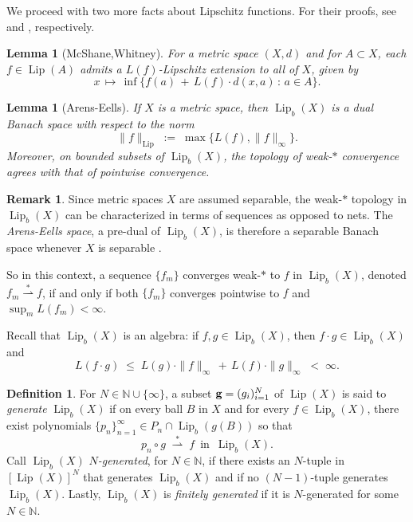 \documentclass[reqno]{amsart}
\theoremstyle{plain}
\newtheorem{lemma}[thm]{Lemma}
\theoremstyle{definition}
\newtheorem{defn}[thm]{Definition}
\newtheorem{rmk}[thm]{Remark}
\theoremstyle{remark}
\numberwithin{equation}{section}
\newcommand{\Lip}{\operatorname{Lip}}
\newcommand{\N}{\mathbb{N}}
\newcommand{\wsto}{\stackrel{*}{\rightharpoonup}}
\begin{document}
We proceed with two more facts about Lipschitz functions.  For their proofs, see \cite{McShane} and \cite{Arens:Eells}, respectively.

\begin{lemma}[McShane,Whitney] \label{lemma_mcshane}
For a metric space $(X,d)$ and for $A \subset X$, each $f \in \Lip(A)$ admits a $L(f)$-Lipschitz extension to all of $X$, given by
$$
x \,\mapsto\, \inf \big\{ f(a) \,+\, L(f) \cdot d(x,a) \,:\, a \in A \big\}.
$$
\end{lemma}

\begin{lemma}[Arens-Eells] \label{lemma_dualbanach}
If $X$ is a metric space, then 
$\Lip_b(X)$ is a dual Banach space with respect to the norm
$$
\|f\|_{\Lip} \;:=\; \max\{ L(f), \|f\|_\infty \}.
$$
Moreover, on bounded subsets of $\Lip_b(X)$, the topology of weak-$*$ convergence agrees with that of pointwise convergence.
\end{lemma}

\begin{rmk} \label{rmk_net}
Since metric spaces $X$ are assumed separable, the weak-$*$ topology in $\Lip_b(X)$ can be characterized in terms of sequences as opposed to nets.  The {\em Arens-Eells space}, a pre-dual of $\Lip_b(X)$, is therefore a separable Banach space whenever $X$ is separable \cite[Sect 2.2]{WeaverLA}.

So in this context, a sequence $\{f_m\}$ converges weak-$*$ to $f$ in $\Lip_b(X)$, denoted $f_m \wsto f$, if and only if both $\{ f_m \}$ converges pointwise to $f$ and $\sup_m L(f_m) < \infty$.
\end{rmk}

Recall that $\Lip_b(X)$ is an algebra: if $f, g \in \Lip_b(X)$, then $f \cdot g \in \Lip_b(X)$ and
$$
L(f \cdot g) \;\leq\; L(g) \cdot \|f\|_\infty \,+\, L(f) \cdot \|g\|_\infty \;<\; \infty.
$$

\begin{defn} \label{defn_fingen}
For $N \in \N \cup \{\infty\}$, a subset ${\bf g} = (g_i)_{i=1}^N$ of $\Lip(X)$ is said to {\em generate} $\Lip_b(X)$ if on every ball $B$ in $X$ and
for every $f \in \Lip_b(X)$, there exist polynomials $\{p_n\}_{n=1}^\infty \in P_n \cap \Lip_b(g(B))$ so that 
$$
p_n \circ g \;\wsto\; f \, \text{ in } \, \Lip_b(X).
$$
Call $\Lip_b(X)$ {\em $N$-generated}, for $N \in \N$, if there exists an $N$-tuple in $[\Lip(X)]^N$ that generates $\Lip_b(X)$ and if no $(N-1)$-tuple generates $\Lip_b(X)$.  Lastly, $\Lip_b(X)$ is {\em finitely generated} if it is $N$-generated for some $N \in \N$.
\end{defn}
\end{document}
